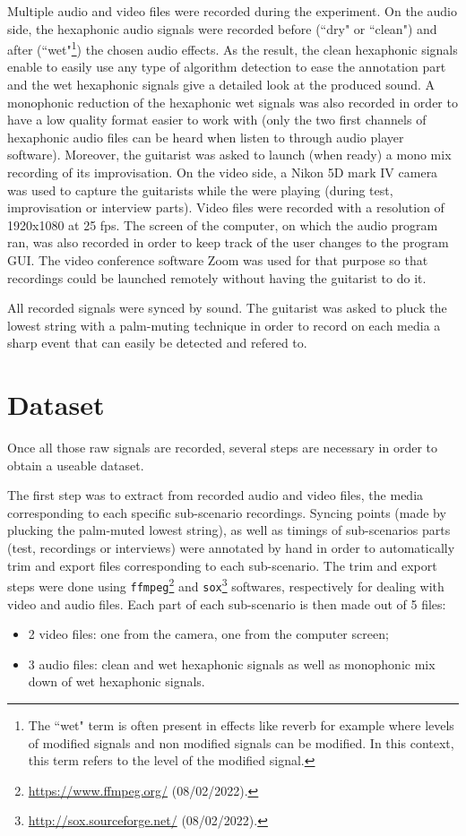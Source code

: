 \documentclass{article}
\begin{document}
Multiple audio and video files were recorded during the experiment. 
On the audio side, the hexaphonic audio signals were recorded before (``dry" or ``clean") and after \linebreak(``wet"\footnote{The ``wet" term is often present in effects like reverb for example where levels of modified signals and non modified signals can be modified. In this context, this term refers to the level of the modified signal.}) the chosen audio effects. As the result, the clean hexaphonic signals enable to easily use any type of algorithm detection to ease the annotation part and the wet hexaphonic signals give a detailed look at the produced sound. A monophonic reduction of the hexaphonic wet signals was also recorded in order to have a low quality format easier to work with (only the two first channels of hexaphonic audio files can be heard when listen to through audio player software).
Moreover, the guitarist was asked to launch (when ready) a mono mix recording of its improvisation. 
On the video side, a Nikon 5D mark IV camera was used to capture the guitarists while the were playing (during test, improvisation or interview parts). Video files were recorded with a resolution of 1920x1080 at 25 fps. The screen of the computer, on which the audio program ran, was also recorded in order to keep track of the user changes to the program GUI. The video conference software Zoom was used for that purpose so that recordings could be launched remotely without having the guitarist to do it.

All recorded signals were synced by sound. The guitarist was asked to pluck the lowest string with a palm-muting technique in order to record on each media a sharp event that can easily be detected and refered to.

\section{Dataset}\label{sec:dataset}
Once all those raw signals are recorded, several steps are necessary in order to obtain a useable dataset. 

The first step was to extract from recorded audio and video files, the media corresponding to each specific sub-scenario recordings. Syncing points (made by plucking the palm-muted lowest string), as well as timings of sub-scenarios parts (test, recordings or interviews) were annotated by hand in order to automatically trim and export files corresponding to each sub-scenario. The trim and export steps were done using \texttt{ffmpeg}\footnote{\url{https://www.ffmpeg.org/} (08/02/2022).} and \texttt{sox}\footnote{\url{http://sox.sourceforge.net/} (08/02/2022).} softwares, respectively for dealing with video and audio files. Each part of each sub-scenario is then made out of 5 files: 
\begin{itemize}
\item 2 video files: one from the camera, one from the computer screen;
\item 3 audio files: clean and wet hexaphonic signals as well as monophonic mix down of wet hexaphonic signals.
\end{itemize}  
\end{document}
